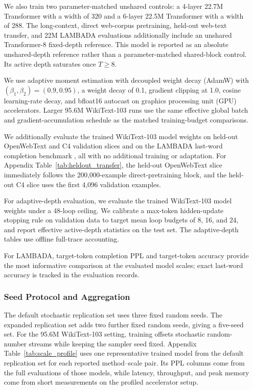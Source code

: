 \documentclass[letterpaper]{article} %
\theoremstyle{remark}
\begin{document}
We also train two parameter-matched unshared controls: a 4-layer 22.7M Transformer with a width of 320 and a 6-layer 22.5M Transformer with a width of 288.  The long-context, direct web-corpus pretraining, held-out web-text transfer, and 22M LAMBADA evaluations additionally include an unshared Transformer-8 fixed-depth reference.  This model is reported as an absolute unshared-depth reference rather than a parameter-matched shared-block control.  Its active depth saturates once $T\ge 8$.

We use adaptive moment estimation with decoupled weight decay (AdamW) \citep{loshchilov2019decoupled} with $(\beta_1,\beta_2)=(0.9,0.95)$, a weight decay of 0.1, gradient clipping at 1.0, cosine learning-rate decay, and bfloat16 autocast on graphics processing unit (GPU) accelerators.  Larger 95.6M WikiText-103 runs use the same effective global batch and gradient-accumulation schedule as the matched training-budget comparisons.

We additionally evaluate the trained WikiText-103 model weights on held-out OpenWebText and C4 validation slices and on the LAMBADA last-word completion benchmark \citep{paperno2016lambada}, all with no additional training or adaptation.  For Appendix Table~\ref{tab:heldout_transfer}, the held-out OpenWebText slice immediately follows the 200,000-example direct-pretraining block, and the held-out C4 slice uses the first 4,096 validation examples.

For adaptive-depth evaluation, we evaluate the trained WikiText-103 model weights under a 48-loop ceiling.  We calibrate a max-token hidden-update stopping rule on validation data to target mean loop budgets of 8, 16, and 24, and report effective active-depth statistics on the test set.  The adaptive-depth tables use offline full-trace accounting.

For LAMBADA, target-token completion PPL and target-token accuracy provide the most informative comparison at the evaluated model scales; exact last-word accuracy is tracked in the evaluation records.

\subsubsection{Seed Protocol and Aggregation}
\label{app:seed-protocol}
The default stochastic replication set uses three fixed random seeds.  The expanded replication set adds two further fixed random seeds, giving a five-seed set.  For the 95.6M WikiText-103 setting, training offsets stochastic random-number streams while keeping the sampler seed fixed.  Appendix Table~\ref{tab:scale_profile} uses one representative trained model from the default replication set for each reported method--scale pair.  Its PPL columns come from the full evaluations of those models, while latency, throughput, and peak memory come from short measurements on the profiled accelerator setup.
\end{document}
